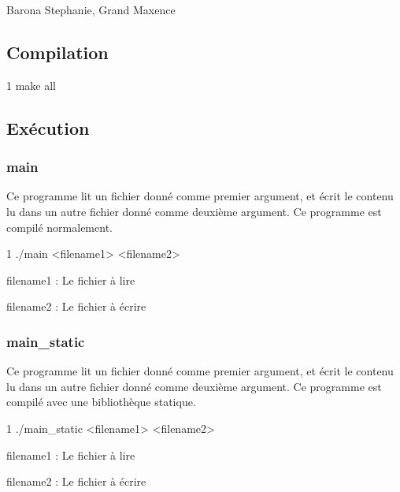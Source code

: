 Barona Stephanie, Grand Maxence

\subsection*{Compilation}


\begin{DoxyCode}
1 make all
\end{DoxyCode}


\subsection*{Exécution}

\subsubsection*{main}

Ce programme lit un fichier donné comme premier argument, et écrit le contenu lu dans un autre fichier donné comme deuxième argument. Ce programme est compilé normalement.


\begin{DoxyCode}
1 ./main <filename1> <filename2>
\end{DoxyCode}

\begin{DoxyItemize}
\item filename1 \+: Le fichier à lire
\item filename2 \+: Le fichier à écrire
\end{DoxyItemize}

\subsubsection*{main\+\_\+static}

Ce programme lit un fichier donné comme premier argument, et écrit le contenu lu dans un autre fichier donné comme deuxième argument. Ce programme est compilé avec une bibliothèque statique.


\begin{DoxyCode}
1 ./main\_static <filename1> <filename2>
\end{DoxyCode}

\begin{DoxyItemize}
\item filename1 \+: Le fichier à lire
\item filename2 \+: Le fichier à écrire
\end{DoxyItemize}

